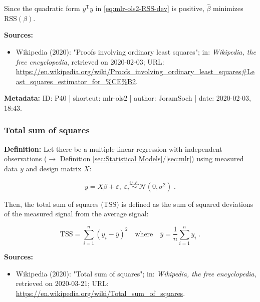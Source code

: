 \documentclass[a4paper,12pt,twoside]{book}
\begin{document}
Since the quadratic form $y^\mathrm{T} y$ in \eqref{eq:mlr-ols2-RSS-dev} is positive, $\hat{\beta}$ minimizes $\mathrm{RSS}(\beta)$.


\vspace{1em}
\textbf{Sources:}
\begin{itemize}
\item Wikipedia (2020): "Proofs involving ordinary least squares"; in: \textit{Wikipedia, the free encyclopedia}, retrieved on 2020-02-03; URL: \url{https://en.wikipedia.org/wiki/Proofs_involving_ordinary_least_squares#Least_squares_estimator_for_%CE%B2}.
\end{itemize}


\vspace{1em}
\textbf{Metadata:} ID: P40 | shortcut: mlr-ols2 | author: JoramSoch | date: 2020-02-03, 18:43.
\vspace{1em}



\subsubsection[\textit{Total sum of squares}]{Total sum of squares} \label{sec:tss}
\setcounter{equation}{0}

\textbf{Definition:} Let there be a multiple linear regression with independent observations ($\rightarrow$ Definition \ref{sec:Statistical Models}/\ref{sec:mlr}) using measured data $y$ and design matrix $X$:

\begin{equation} \label{eq:tss-mlr}
y = X\beta + \varepsilon, \; \varepsilon_i \overset{\mathrm{i.i.d.}}{\sim} \mathcal{N}(0, \sigma^2) \; .
\end{equation}

Then, the total sum of squares (TSS) is defined as the sum of squared deviations of the measured signal from the average signal:

\begin{equation} \label{eq:tss-tss}
\mathrm{TSS} = \sum_{i=1}^n (y_i - \bar{y})^2 \quad \text{where} \quad \bar{y} = \frac{1}{n} \sum_{i=1}^n y_i \; .
\end{equation}


\vspace{1em}
\textbf{Sources:}
\begin{itemize}
\item Wikipedia (2020): "Total sum of squares"; in: \textit{Wikipedia, the free encyclopedia}, retrieved on 2020-03-21; URL: \url{https://en.wikipedia.org/wiki/Total_sum_of_squares}.
\end{itemize}
\end{document}
